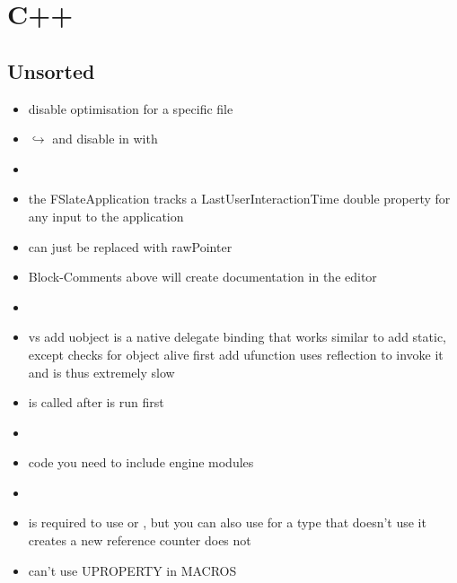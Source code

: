 \chapter{C++}

    \section{Unsorted}
        \begin{itemize}
            \item disable optimisation for a specific file \\ 
            \item $\hookrightarrow$ and disable  in  with 
            \item 
            \item the FSlateApplication tracks a LastUserInteractionTime double property for any input to the application
            \item {} can just be replaced with rawPointer
            \item Block-Comments above  will create documentation in the editor
            \item 
            \item {} vs  add uobject is a native delegate binding that works similar to add static, except checks for object alive first
            add ufunction uses reflection to invoke it and is thus extremely slow
            \item {} is called after  is run first
            \item 
            \item code you need to include engine modules 
            \item 
            \item {} is required to use  or , but you can also use  for a type that doesn't use it 
                     creates a new reference counter
                     does not
            \item can't use UPROPERTY in MACROS
        \end{itemize}

